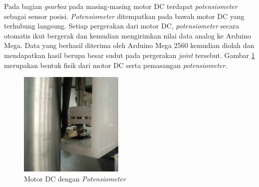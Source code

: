 	\begin{table}[H]
	\centering
	\caption{Spesifikasi Motor DC pada Robot SCARA}
	\label{tbl.spesifikasimotordc}
\end{table}
Pada bagian \textit{gearbox} pada masing-masing motor DC terdapat \textit{potensiometer} sebagai sensor posisi. \textit{Potensiometer} ditempatkan pada bawah motor DC yang terhubung langsung. Setiap pergerakan dari motor DC, \textit{potensiometer} secara otomatis ikut bergerak dan kemudian mengirimkan nilai data analog ke Arduino Mega. Data yang berhasil diterima oleh Arduino Mega 2560 kemudian diolah dan mendapatkan hasil berupa besar sudut pada pergerakan \textit{joint} tersebut. Gambar \ref{pic.potensiometer} merupakan bentuk fisik dari motor DC serta pemasangan \textit{potensiometer}.
\begin{figure}[H]
	\centering
	\includegraphics[width=5cm]{gambar/potsementara.jpg}
	\caption{Motor DC dengan \textit{Potensiometer}}
	\label{pic.potensiometer}
\end{figure}

